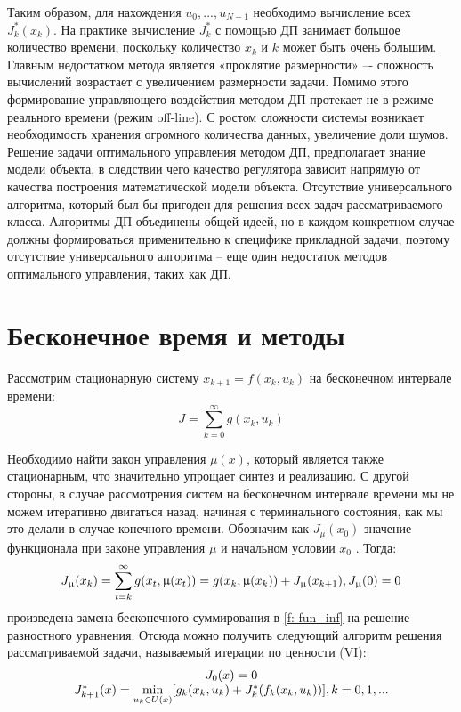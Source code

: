 Таким образом, для нахождения $u_0, ..., u_{N-1}$ необходимо вычисление всех $J^*_k(x_k)$. На практике вычисление \(J^*_k\) с помощью ДП занимает большое количество времени, поскольку количество \(x_k\) и \(k\) может быть очень большим. Главным недостатком метода является «проклятие размерности» –- сложность вычислений возрастает с увеличением размерности задачи. Помимо этого формирование управляющего воздействия методом ДП протекает не в режиме реального времени (режим off-line). С ростом сложности системы возникает необходимость хранения огромного количества данных, увеличение доли шумов. Решение задачи оптимального управления методом ДП, предполагает знание модели объекта, в следствии чего качество регулятора зависит напрямую от качества построения математической модели объекта. Отсутствие универсального алгоритма, который был бы пригоден для решения всех задач рассматриваемого класса. Алгоритмы ДП объединены общей идеей, но в каждом конкретном случае должны формироваться применительно к специфике прикладной задачи, поэтому отсутствие универсального алгоритма -- еще один недостаток методов оптимального управления, таких как ДП.


\section{Бесконечное время и методы}
Рассмотрим стационарную систему $x_{k+1} = f(x_k, u_k)$ на бесконечном интервале времени:
\begin{equation}
\label{f: fun_inf}
J = \sum_{k=0}^\infty g(x_k, u_k)
\end{equation}

Необходимо найти закон управления $\mu (x)$, который является также стационарным, что значительно упрощает синтез и реализацию. С другой стороны, в случае рассмотрения систем на бесконечном интервале времени мы не можем итеративно двигаться назад, начиная с терминального состояния, как мы это делали в случае конечного времени.
Обозначим как $J_{\mu} (x_0)$ значение функционала при законе управления $\mu$ и начальном условии $x_0$ . Тогда:
\begin{equation*}
	J_{\mu}(x_k) = \sum_{t=k}^{\infty} g(x_t, \mu(x_t)) = g(x_k,\mu(x_k)) + J_\mu(x_{k+1}), \space J_{\mu}(0) = 0
\end{equation*}
произведена замена бесконечного суммирования в \ref{f: fun_inf} на решение разностного уравнения. Отсюда можно получить следующий алгоритм решения рассматриваемой задачи, называемый итерации по ценности (VI):
\begin{equation*}
	\begin{matrix}
		J_0(x) = 0 \\
		J^*_{k+1}(x) = \underset{u_k \in U(x)}{\min}{[g_k(x_k, u_k) + J^*_{k}(f_k(x_k, u_k))]}, \space k = 0, 1, ...
	\end{matrix}
\end{equation*}

